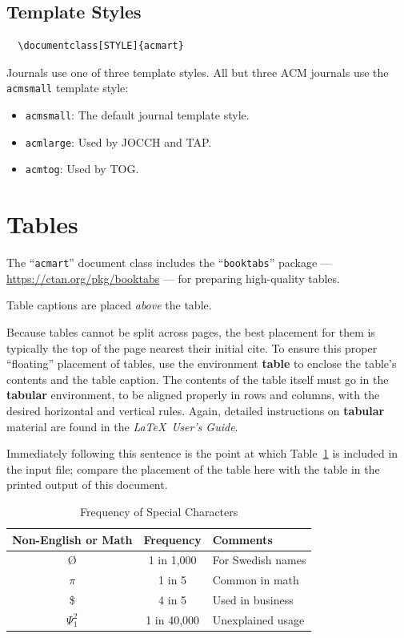 \documentclass[acmlarge,screen]{acmart}
\begin{document}
\subsection{Template Styles}


\begin{verbatim}
  \documentclass[STYLE]{acmart}
\end{verbatim}

Journals use one of three template styles. All but three ACM journals use the {\verb|acmsmall|} template style:
\begin{itemize}
\item {\verb|acmsmall|}: The default journal template style.
\item {\verb|acmlarge|}: Used by JOCCH and TAP.
\item {\verb|acmtog|}: Used by TOG.
\end{itemize}


\section{Tables}

The ``\verb|acmart|'' document class includes the ``\verb|booktabs|'' package --- \url{https://ctan.org/pkg/booktabs} --- for preparing high-quality tables. 

Table captions are placed {\it above} the table.

Because tables cannot be split across pages, the best placement for them is typically the top of the page nearest their initial cite.  To ensure this proper ``floating'' placement of tables, use the environment \textbf{table} to enclose the table's contents and the table caption.  The contents of the table itself must go in the \textbf{tabular} environment, to be aligned properly in rows and columns, with the desired horizontal and vertical rules.  Again, detailed instructions on \textbf{tabular} material are found in the \textit{\LaTeX\ User's Guide}.

Immediately following this sentence is the point at which Table~\ref{tab:freq} is included in the input file; compare the placement of the table here with the table in the printed output of this document.

\begin{table}
  \caption{Frequency of Special Characters}
  \label{tab:freq}
  \begin{tabular}{ccl}
    \toprule
    Non-English or Math&Frequency&Comments\\
    \midrule
    \O & 1 in 1,000& For Swedish names\\
    $\pi$ & 1 in 5& Common in math\\
    \$ & 4 in 5 & Used in business\\
    $\Psi^2_1$ & 1 in 40,000& Unexplained usage\\
  \bottomrule
\end{tabular}
\end{table}
\end{document}
